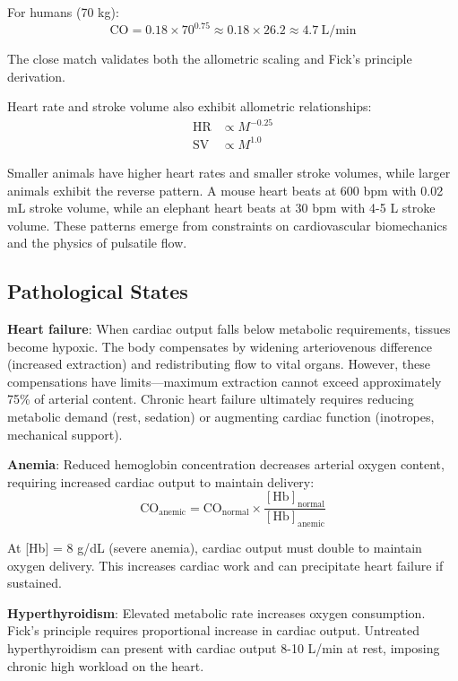 \documentclass[12pt,a4paper]{article}
\theoremstyle{remark}
\begin{document}
For humans (70 kg):
\begin{equation}
\mathrm{CO} = 0.18 \times 70^{0.75} \approx 0.18 \times 26.2 \approx 4.7~\mathrm{L/min}
\end{equation}

The close match validates both the allometric scaling and Fick's principle derivation.

Heart rate and stroke volume also exhibit allometric relationships:
\begin{align}
\mathrm{HR} &\propto M^{-0.25} \\
\mathrm{SV} &\propto M^{1.0}
\end{align}

Smaller animals have higher heart rates and smaller stroke volumes, while larger animals exhibit the reverse pattern. A mouse heart beats at 600 bpm with 0.02 mL stroke volume, while an elephant heart beats at 30 bpm with 4-5 L stroke volume. These patterns emerge from constraints on cardiovascular biomechanics and the physics of pulsatile flow.

\subsection{Pathological States}

\textbf{Heart failure}: When cardiac output falls below metabolic requirements, tissues become hypoxic. The body compensates by widening arteriovenous difference (increased extraction) and redistributing flow to vital organs. However, these compensations have limits—maximum extraction cannot exceed approximately 75\% of arterial content. Chronic heart failure ultimately requires reducing metabolic demand (rest, sedation) or augmenting cardiac function (inotropes, mechanical support).

\textbf{Anemia}: Reduced hemoglobin concentration decreases arterial oxygen content, requiring increased cardiac output to maintain delivery:
\begin{equation}
\mathrm{CO}_{\mathrm{anemic}} = \mathrm{CO}_{\mathrm{normal}} \times \frac{[\mathrm{Hb}]_{\mathrm{normal}}}{[\mathrm{Hb}]_{\mathrm{anemic}}}
\end{equation}

At [Hb] = 8 g/dL (severe anemia), cardiac output must double to maintain oxygen delivery. This increases cardiac work and can precipitate heart failure if sustained.

\textbf{Hyperthyroidism}: Elevated metabolic rate increases oxygen consumption. Fick's principle requires proportional increase in cardiac output. Untreated hyperthyroidism can present with cardiac output 8-10 L/min at rest, imposing chronic high workload on the heart.
\end{document}

